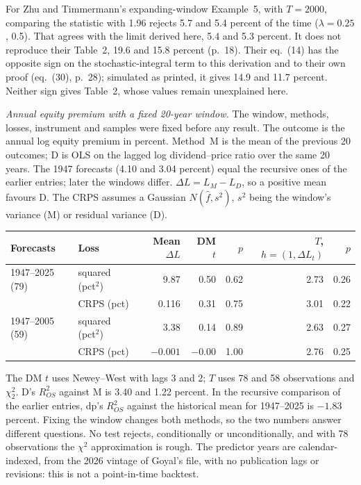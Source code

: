 \begin{qfmethod}
For Zhu and Timmermann's expanding-window Example~5, with $T=2000$, comparing the statistic with 1.96 rejects 5.7 and 5.4 percent of the time ($\lambda=0.25$, 0.5). That agrees with the limit derived here, 5.4 and 5.3 percent. It does not reproduce their Table~2, 19.6 and 15.8 percent (p.~18). Their eq.~(14) has the opposite sign on the stochastic-integral term to this derivation and to their own proof (eq.~(30), p.~28); simulated as printed, it gives 14.9 and 11.7 percent. Neither sign gives Table~2, whose values remain unexplained here.

\emph{Annual equity premium with a fixed 20-year window.} The window, methods, losses, instrument and samples were fixed before any result. The outcome is the annual log equity premium in percent. Method~M is the mean of the previous 20 outcomes; D is OLS on the lagged log dividend--price ratio over the same 20 years. The 1947 forecasts (4.10 and 3.04 percent) equal the recursive ones of the earlier entries; later the windows differ. $\Delta L=L_M-L_D$, so a positive mean favours D. The CRPS assumes a Gaussian $N(\hat f,s^2)$, $s^2$ being the window's variance (M) or residual variance (D).
\begin{center}\small
\begin{tabular}{@{}llrrrrr@{}}
\toprule
Forecasts & Loss & Mean $\Delta L$ & DM $t$ & $p$ & $T$, $h=(1,\Delta L_t)$ & $p$ \\
\midrule
1947--2025 (79) & squared (pct$^2$) & 9.87 & 0.50 & 0.62 & 2.73 & 0.26 \\
 & CRPS (pct) & 0.116 & 0.31 & 0.75 & 3.01 & 0.22 \\
1947--2005 (59) & squared (pct$^2$) & 3.38 & 0.14 & 0.89 & 2.63 & 0.27 \\
 & CRPS (pct) & $-0.001$ & $-0.00$ & 1.00 & 2.76 & 0.25 \\
\bottomrule
\end{tabular}
\end{center}
The DM $t$ uses Newey--West with lags 3 and 2; $T$ uses 78 and 58 observations and $\chi^2_2$. D's $R^2_{OS}$ against M is 3.40 and 1.22 percent. In the recursive comparison of the earlier entries, dp's $R^2_{OS}$ against the historical mean for 1947--2025 is $-1.83$ percent. Fixing the window changes both methods, so the two numbers answer different questions. No test rejects, conditionally or unconditionally, and with 78 observations the $\chi^2$ approximation is rough. The predictor years are calendar-indexed, from the 2026 vintage of Goyal's file, with no publication lags or revisions: this is not a point-in-time backtest.


\end{qfmethod}
